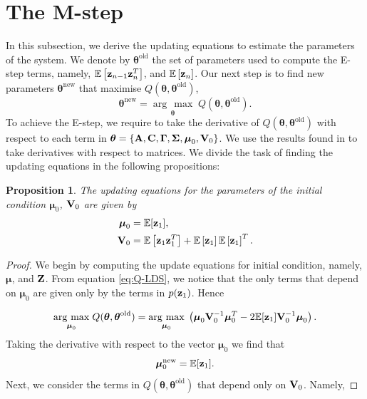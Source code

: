 \documentclass[12pt, oneside]{book}
\numberwithin{equation}{section}
\newcommand{\argmax}[1]{\underset{#1}{\operatorname{arg}\,\operatorname{max}}\;}
\newcommand{\expectation}[1]{\mathbb{E}\left[#1\right]}
\newcommand{\z}{{\bf z}}
\newtheorem{proposition}{Proposition}[section]
\begin{document}
{\section{The M-step}
In this subsection, we derive the updating equations to estimate the parameters of the system. We denote by $\boldsymbol{\theta}^\text{old}$ the set of parameters used to compute the E-step terms, namely, $\expectation{\z_{n-1}\z_{n}^T}$, and $\expectation{\z_{n}}$. Our next step is to find new parameters $\boldsymbol{\theta}^\text{new}$ that maximise $Q(\boldsymbol\theta, \boldsymbol\theta^\text{old})$,
\begin{equation}
	\boldsymbol{\theta}^\text{new} = \argmax{\boldsymbol\theta} Q(\boldsymbol\theta, \boldsymbol\theta^\text{old}).
\end{equation}
To achieve the E-step, we require to take the derivative of $Q(\boldsymbol{\theta}, \boldsymbol{\theta}^\text{old})$ with respect to each term in $\boldsymbol\theta = \{{\bf A}, {\bf C}, \boldsymbol\Gamma, \boldsymbol\Sigma, \boldsymbol\mu_0, {\bf V}_0\}$. We use the results found in \cite{matrix-cookbook} to take derivatives with respect to matrices. We divide the task of finding the updating equations in the following propositions:

\begin{proposition}
	The updating equations for the parameters of the initial condition $\boldsymbol{\mu}_0$, ${\bf V}_0$ are given by
	\begin{align}
		\boldsymbol{\mu}_0 &= \mathbb{E}[{\z_1}], \\
		{\bf V}_0 &= \expectation{\z_1 \z_1^T} + \expectation{\z_1}\expectation{\z_1}^T.
	\end{align}
\end{proposition}

\begin{proof}
	We begin by computing the update equations for initial condition, namely, $\boldsymbol\mu$, and $\bf Z$. From equation \eqref{eq:Q-LDS}, we notice that the only terms that depend on $\boldsymbol{\mu}_0$ are given only by the terms in $p(\z_1)$. Hence

\begin{align}
	\argmax{\boldsymbol{\mu}_0} Q(\boldsymbol\theta, \boldsymbol\theta^\text{old}) = \argmax{\boldsymbol{\mu}_0}\left( \boldsymbol{\mu}_0 {\bf V}_0^{-1}\boldsymbol{\mu}_0^T -2\mathbb{E}[{\z_1}]{\bf V}_0^{-1}\boldsymbol{\mu}_0\right).
\end{align}
Taking the derivative with respect to the vector $\boldsymbol{\mu}_0$ we find that
\begin{equation}
	\boldsymbol{\mu}_0^\text{new} = \mathbb{E}[{\z_1}].
\end{equation}
Next, we consider the terms in $Q(\boldsymbol\theta, \boldsymbol\theta^\text{old})$ that depend only on ${\bf V}_0$. Namely,


\end{proof}}
\end{document}
